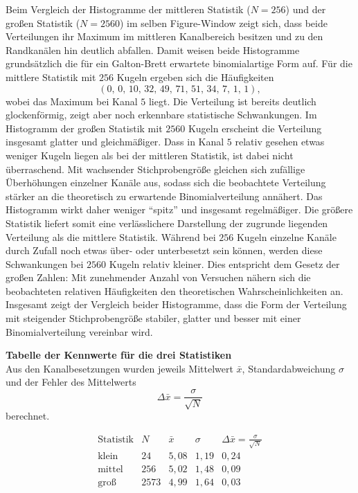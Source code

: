 \documentclass{report}
\begin{document}
\noindent
Beim Vergleich der Histogramme der mittleren Statistik (\(N=256\)) und der großen Statistik (\(N=2560\)) im selben Figure-Window zeigt sich, dass beide Verteilungen ihr Maximum im mittleren Kanalbereich besitzen und zu den Randkanälen hin deutlich abfallen. Damit weisen beide Histogramme grundsätzlich die für ein Galton-Brett erwartete binomialartige Form auf.
\noindent
Für die mittlere Statistik mit \(256\) Kugeln ergeben sich die Häufigkeiten
\[
(0,\,0,\,10,\,32,\,49,\,71,\,51,\,34,\,7,\,1,\,1),
\]
wobei das Maximum bei Kanal \(5\) liegt. Die Verteilung ist bereits deutlich glockenförmig, zeigt aber noch erkennbare statistische Schwankungen.
\noindent
Im Histogramm der großen Statistik mit \(2560\) Kugeln erscheint die Verteilung insgesamt glatter und gleichmäßiger. Dass in Kanal \(5\) relativ gesehen etwas weniger Kugeln liegen als bei der mittleren Statistik, ist dabei nicht überraschend. Mit wachsender Stichprobengröße gleichen sich zufällige Überhöhungen einzelner Kanäle aus, sodass sich die beobachtete Verteilung stärker an die theoretisch zu erwartende Binomialverteilung annähert. Das Histogramm wirkt daher weniger ``spitz'' und insgesamt regelmäßiger.
\noindent
Die größere Statistik liefert somit eine verlässlichere Darstellung der zugrunde liegenden Verteilung als die mittlere Statistik. Während bei \(256\) Kugeln einzelne Kanäle durch Zufall noch etwas über- oder unterbesetzt sein können, werden diese Schwankungen bei \(2560\) Kugeln relativ kleiner. Dies entspricht dem Gesetz der großen Zahlen: Mit zunehmender Anzahl von Versuchen nähern sich die beobachteten relativen Häufigkeiten den theoretischen Wahrscheinlichkeiten an.
\noindent
Insgesamt zeigt der Vergleich beider Histogramme, dass die Form der Verteilung mit steigender Stichprobengröße stabiler, glatter und besser mit einer Binomialverteilung vereinbar wird.

\bigskip
\noindent
\textbf{Tabelle der Kennwerte für die drei Statistiken}
\\
\noindent
Aus den Kanalbesetzungen wurden jeweils Mittelwert \(\bar{x}\), Standardabweichung \(\sigma\) und der Fehler des Mittelwerts
\[
\Delta \bar{x}=\frac{\sigma}{\sqrt{N}}
\]
berechnet.

\[
\begin{array}{l|c|c|c|c}
\text{Statistik} & N & \bar{x} & \sigma & \Delta \bar{x}=\frac{\sigma}{\sqrt{N}} \\
\hline
\text{klein}  & 24   & 5{,}08 & 1{,}19 & 0{,}24 \\
\text{mittel} & 256  & 5{,}02 & 1{,}48 & 0{,}09 \\
\text{groß}   & 2573 & 4{,}99 & 1{,}64 & 0{,}03
\end{array}
\]
\end{document}
